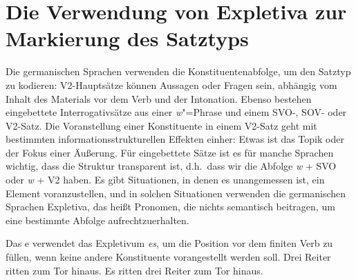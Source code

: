 \section{Die Verwendung von Expletiva zur Markierung des Satztyps}

Die germanischen Sprachen verwenden die Konstituentenabfolge, um den Satztyp zu kodieren: V2-Hauptsätze können
Aussagen oder Fragen sein, abhängig vom Inhalt des Materials vor dem Verb und der
Intonation. Ebenso bestehen eingebettete Interrogativsätze aus einer \emph{w}"=Phrase und einem SVO-, SOV-
oder V2-Satz. Die Voranstellung einer Konstituente in einem V2-Satz geht mit bestimmten informationsstrukturellen
Effekten einher: Etwas ist das Topik oder der Fokus einer Äußerung. Für eingebettete Sätze ist es
für manche Sprachen wichtig, dass die Struktur transparent ist, d.h.\ dass wir die Abfolge \emph{w} + SVO oder
\emph{w} + V2 haben. Es gibt Situationen, in denen es unangemessen ist, ein Element voranzustellen, und in
solchen Situationen verwenden die germanischen Sprachen Expletiva, das heißt Pronomen, die nichts
semantisch beitragen, um eine bestimmte Abfolge aufrechtzuerhalten.

Das e verwendet das Expletivum \emph{es}, um die Position vor dem finiten Verb zu füllen, wenn keine andere
Konstituente vorangestellt werden soll.
\eal
\ex
Drei Reiter ritten zum Tor hinaus.\german
\ex
Es ritten drei Reiter zum Tor hinaus.
\zl

